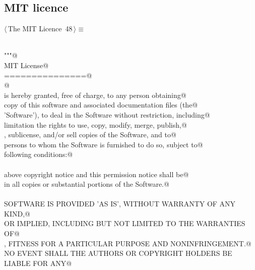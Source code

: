 \documentclass[11pt,oneside]{article}    %
\begin{document}
\subsection{MIT licence}
\begin{flushleft} \small \label{scrap79}
\protect{}$\langle\,$The MIT Licence\nobreak\ {\footnotesize 48}$\,\rangle\equiv$
\vspace{-1ex}
\begin{list}{}{} \item
\mbox{}\verb@@\\
\mbox{}\verb@"""@\\
\mbox{}\verb@The MIT License@\\
\mbox{}\verb@===============@\\
\mbox{}\verb@    @\\
\mbox{}\verb@Permission is hereby granted, free of charge, to any person obtaining@\\
\mbox{}\verb@a copy of this software and associated documentation files (the@\\
\mbox{}\verb@'Software'), to deal in the Software without restriction, including@\\
\mbox{}\verb@without limitation the rights to use, copy, modify, merge, publish,@\\
\mbox{}\verb@distribute, sublicense, and/or sell copies of the Software, and to@\\
\mbox{}\verb@permit persons to whom the Software is furnished to do so, subject to@\\
\mbox{}\verb@the following conditions:@\\
\mbox{}\verb@@\\
\mbox{}\verb@The above copyright notice and this permission notice shall be@\\
\mbox{}\verb@included in all copies or substantial portions of the Software.@\\
\mbox{}\verb@@\\
\mbox{}\verb@THE SOFTWARE IS PROVIDED 'AS IS', WITHOUT WARRANTY OF ANY KIND,@\\
\mbox{}\verb@EXPRESS OR IMPLIED, INCLUDING BUT NOT LIMITED TO THE WARRANTIES OF@\\
\mbox{}\verb@MERCHANTABILITY, FITNESS FOR A PARTICULAR PURPOSE AND NONINFRINGEMENT.@\\
\mbox{}\verb@IN NO EVENT SHALL THE AUTHORS OR COPYRIGHT HOLDERS BE LIABLE FOR ANY@\\

\end{list}
\end{flushleft}
\end{document}
